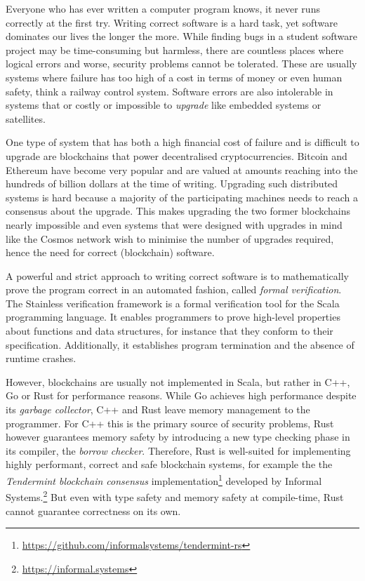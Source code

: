 Everyone who has ever written a computer program knows, it never runs correctly
at the first try. Writing correct software is a hard task, yet software
dominates our lives the longer the more. While finding bugs in a student
software project may be time-consuming but harmless, there are countless places
where logical errors and worse, security problems cannot be tolerated. These are
usually systems where failure has too high of a cost in terms of money or even
human safety, think a railway control system. Software errors are also
intolerable in systems that or costly or impossible to \emph{upgrade} like
embedded systems or satellites.

One type of system that has both a high financial cost of failure and is
difficult to upgrade are blockchains that power decentralised cryptocurrencies.
Bitcoin \cite{bitcoin} and Ethereum \cite{ethereum} have become very popular and
are valued at amounts reaching into the hundreds of billion dollars at the time
of writing. Upgrading such distributed systems is hard because a majority of the
participating machines needs to reach a consensus about the upgrade. This makes
upgrading the two former blockchains nearly impossible and even systems that
were designed with upgrades in mind like the Cosmos network \cite{cosmos} wish
to minimise the number of upgrades required, hence the need for correct
(blockchain) software.

A powerful and strict approach to writing correct software is to mathematically
prove the program correct in an automated fashion, called \emph{formal
verification}. The Stainless verification framework \cite{stainless} is a formal
verification tool for the Scala programming language. It enables programmers to
prove high-level properties about functions and data structures, for instance
that they conform to their specification. Additionally, it establishes program
termination and the absence of runtime crashes.

However, blockchains are usually not implemented in Scala, but rather in C++, Go
or Rust for performance reasons. While Go achieves high performance despite its
\emph{garbage collector}, C++ and Rust leave memory management to the
programmer. For C++ this is the primary source of security problems, Rust
however guarantees memory safety by introducing a new type checking phase in its
compiler, the \emph{borrow checker}. Therefore, Rust is well-suited for
implementing highly performant, correct and safe blockchain systems, for example
the  the \emph{Tendermint blockchain consensus}
implementation\footnote{\url{https://github.com/informalsystems/tendermint-rs}}
developed by Informal Systems.\footnote{\url{https://informal.systems}} But even
with type safety and memory safety at compile-time, Rust cannot guarantee
correctness on its own.

